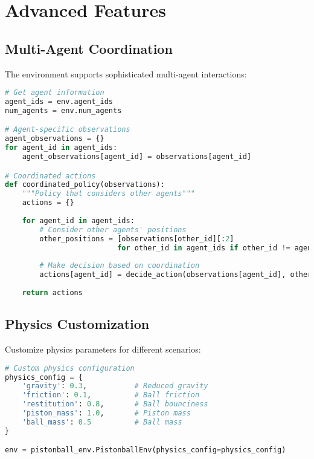 \section{Advanced Features}

\subsection{Multi-Agent Coordination}

The environment supports sophisticated multi-agent interactions:

\begin{lstlisting}[language=python, caption=Multi-Agent Coordination]
# Get agent information
agent_ids = env.agent_ids
num_agents = env.num_agents

# Agent-specific observations
agent_observations = {}
for agent_id in agent_ids:
    agent_observations[agent_id] = observations[agent_id]

# Coordinated actions
def coordinated_policy(observations):
    """Policy that considers other agents"""
    actions = {}
    
    for agent_id in agent_ids:
        # Consider other agents' positions
        other_positions = [observations[other_id][:2] 
                          for other_id in agent_ids if other_id != agent_id]
        
        # Make decision based on coordination
        actions[agent_id] = decide_action(observations[agent_id], other_positions)
    
    return actions
\end{lstlisting}

\subsection{Physics Customization}

Customize physics parameters for different scenarios:

\begin{lstlisting}[language=python, caption=Physics Customization]
# Custom physics configuration
physics_config = {
    'gravity': 0.3,           # Reduced gravity
    'friction': 0.1,          # Ball friction
    'restitution': 0.8,       # Ball bounciness
    'piston_mass': 1.0,       # Piston mass
    'ball_mass': 0.5          # Ball mass
}

env = pistonball_env.PistonballEnv(physics_config=physics_config)
\end{lstlisting}

